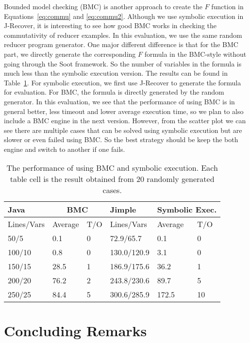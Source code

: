 \documentclass{llncs}
\begin{document}
Bounded model checking (BMC) is another approach to create the $F$ function in Equations~\ref{eq:commu} and \ref{eq:commu2}. Although we use symbolic execution in J-Recover, it is interesting to see how good BMC works in checking the commutativity of reducer examples. In this evaluation, we use the same random reducer program generator. One major different difference is that for the BMC part, we directly generate the corresponding $F$ formula in the BMC-style without going through the Soot framework. So the number of variables in the formula is much less than the symbolic execution version. The results can be found in Table~\ref{tab:bmc}. For symbolic execution, we first use J-Recover to generate the formula for evaluation. For BMC, the formula is directly generated by the random generator. In this evaluation, we see that the performance of using BMC is in general better, less timeout and lower average execution time, so we plan to also include a BMC engine in the next version. However, from the scatter plot we can see there are multiple cases that  can be solved using symbolic execution but are slower or even failed using BMC. So the best strategy should be keep the both engine and switch to another if one fails.




\begin{table}[htb]

\begin{minipage}{0.7\textwidth}	
	\begin{tabular}{|l||l|l| l||l|l|}
\hline
		Java& \multicolumn{2}{c|}{\small BMC}	& Jimple& \multicolumn{2}{c|}{\small Symbolic Exec.} \\
\hline
		\small Lines/Vars & \small Average & \small  \small T/O & Lines/Vars& \small Average & \small  \small T/O \\
\hline
\hline
		50/5	&	0.1		&	0	&	72.9/65.7	&	0.1	&		0	\\
\hline
		100/10	&	0.8	&		0	&	130.0/120.9	&	3.1	&	0	\\
\hline
		150/15	&	28.5	&		1	&	186.9/175.6	&	36.2	&		1	\\
\hline
		200/20	&	76.2	&		2	&	243.8/230.6	&	89.7	&		5	\\
\hline
		250/25	&	84.4	&		5	&	300.6/285.9	&	172.5	&		10	\\
\hline
	\end{tabular}
		\end{minipage}		
	\begin{minipage}{0.29\textwidth}
		\end{minipage}		
	\caption{The performance of using BMC and symbolic execution. Each table cell is the result obtained from 20 randomly generated cases.}
	\label{tab:bmc}
	
\end{table}

\section{Concluding Remarks}




\end{document}
